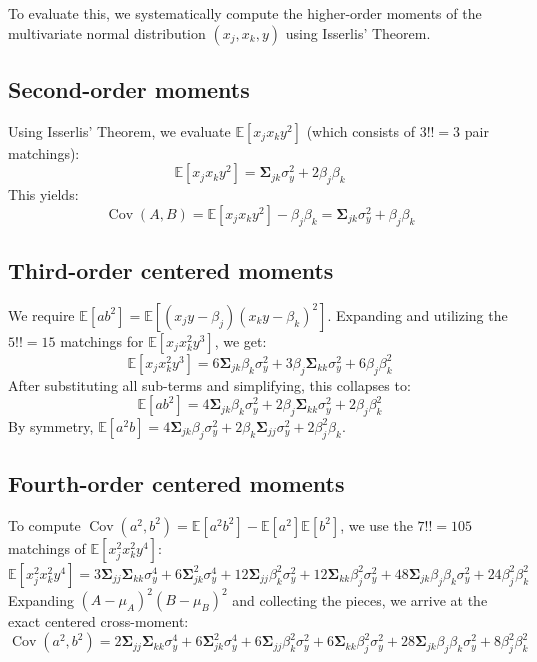 \documentclass[11pt]{article}
\newcommand{\bmSigma}{\boldsymbol{\Sigma}}
\newcommand{\1}{\mathbf{1}}
\begin{document}
To evaluate this, we systematically compute the higher-order moments of the multivariate normal distribution $(x_j, x_k, y)$ using Isserlis' Theorem.

\subsection{Second-order moments}
Using Isserlis' Theorem, we evaluate $\mathbb{E}[x_j x_k y^2]$ (which consists of $3!! = 3$ pair matchings):
\[
    \mathbb{E}[x_j x_k y^2] = \bmSigma_{jk} \sigma_y^2 + 2 \beta_j \beta_k
\]
This yields:
\[
    \operatorname{Cov}(A, B) = \mathbb{E}[x_j x_k y^2] - \beta_j \beta_k = \bmSigma_{jk} \sigma_y^2 + \beta_j \beta_k
\]

\subsection{Third-order centered moments}
We require $\mathbb{E}[a b^2] = \mathbb{E}[(x_j y - \beta_j)(x_k y - \beta_k)^2]$. Expanding and utilizing the $5!! = 15$ matchings for $\mathbb{E}[x_j x_k^2 y^3]$, we get:
\[
    \mathbb{E}[x_j x_k^2 y^3] = 6 \bmSigma_{jk} \beta_k \sigma_y^2 + 3 \beta_j \bmSigma_{kk} \sigma_y^2 + 6 \beta_j \beta_k^2
\]
After substituting all sub-terms and simplifying, this collapses to:
\[
    \mathbb{E}[a b^2] = 4 \bmSigma_{jk} \beta_k \sigma_y^2 + 2 \beta_j \bmSigma_{kk} \sigma_y^2 + 2 \beta_j \beta_k^2
\]
By symmetry, $\mathbb{E}[a^2 b] = 4 \bmSigma_{jk} \beta_j \sigma_y^2 + 2 \beta_k \bmSigma_{jj} \sigma_y^2 + 2 \beta_j^2 \beta_k$.

\subsection{Fourth-order centered moments}
To compute $\operatorname{Cov}(a^2, b^2) = \mathbb{E}[a^2 b^2] - \mathbb{E}[a^2]\mathbb{E}[b^2]$, we use the $7!! = 105$ matchings of $\mathbb{E}[x_j^2 x_k^2 y^4]$:
\[
    \mathbb{E}[x_j^2 x_k^2 y^4] = 3 \bmSigma_{jj} \bmSigma_{kk} \sigma_y^4 + 6 \bmSigma_{jk}^2 \sigma_y^4 + 12 \bmSigma_{jj} \beta_k^2 \sigma_y^2 + 12 \bmSigma_{kk} \beta_j^2 \sigma_y^2 + 48 \bmSigma_{jk} \beta_j \beta_k \sigma_y^2 + 24 \beta_j^2 \beta_k^2
\]
Expanding $(A - \mu_A)^2 (B - \mu_B)^2$ and collecting the pieces, we arrive at the exact centered cross-moment:
\[
    \operatorname{Cov}(a^2, b^2) = 2 \bmSigma_{jj} \bmSigma_{kk} \sigma_y^4 + 6 \bmSigma_{jk}^2 \sigma_y^4 + 6 \bmSigma_{jj} \beta_k^2 \sigma_y^2 + 6 \bmSigma_{kk} \beta_j^2 \sigma_y^2 + 28 \bmSigma_{jk} \beta_j \beta_k \sigma_y^2 + 8 \beta_j^2 \beta_k^2
\]
\end{document}
